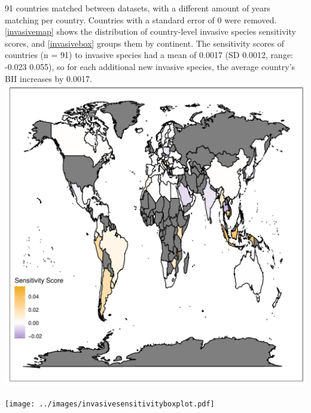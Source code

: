 \documentclass[11pt, a4paper, titlepage]{article}
\begin{document}
	
	91 countries matched between datasets, with a different amount of years matching per country. Countries with a standard error of 0 were removed. \autoref{invasivemap} shows the distribution of country-level invasive species sensitivity scores, and \autoref{invasivebox} groups them by continent. The sensitivity scores of countries (n = 91) to invasive species had a mean of 0.0017 (SD 0.0012, range: -0.023  0.055), so for each additional new invasive species, the average country's BII increases by 0.0017.\newline
	\includegraphics[scale=0.95]{../images/invasivesensitivitymapgradient.pdf}
	\label{invasivemap}
	
	\texttt{[image: ../images/invasivesensitivityboxplot.pdf]}
	\label{invasivebox}
\end{document}
